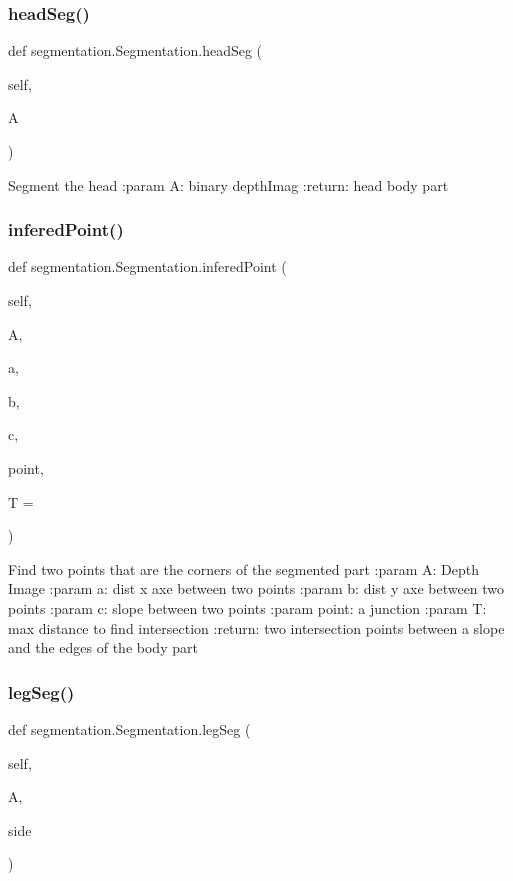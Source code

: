 \subsubsection{head\+Seg()}
{\footnotesize\ttfamily def segmentation.\+Segmentation.\+head\+Seg (\begin{DoxyParamCaption}\item[{}]{self,  }\item[{}]{A }\end{DoxyParamCaption})}

\begin{DoxyVerb}Segment the head
:param A: binary depthImag
:return: head body part
\end{DoxyVerb}
 \mbox{\label{classsegmentation_1_1_segmentation_abc300f2410a48845de0e9ae32df38241}} 
\subsubsection{infered\+Point()}
{\footnotesize\ttfamily def segmentation.\+Segmentation.\+infered\+Point (\begin{DoxyParamCaption}\item[{}]{self,  }\item[{}]{A,  }\item[{}]{a,  }\item[{}]{b,  }\item[{}]{c,  }\item[{}]{point,  }\item[{}]{T = {} }\end{DoxyParamCaption})}

\begin{DoxyVerb}Find two points that are the corners of the segmented part
:param A: Depth Image
:param a: dist x axe between two points
:param b: dist y axe between two points
:param c: slope between two points
:param point: a junction
:param T: max distance to find intersection
:return: two intersection points between a slope and the edges of the body part
\end{DoxyVerb}
 \mbox{\label{classsegmentation_1_1_segmentation_a095a3b3205d784d6e7c3e072945ae7a5}} 
\subsubsection{leg\+Seg()}
{\footnotesize\ttfamily def segmentation.\+Segmentation.\+leg\+Seg (\begin{DoxyParamCaption}\item[{}]{self,  }\item[{}]{A,  }\item[{}]{side }\end{DoxyParamCaption})}

